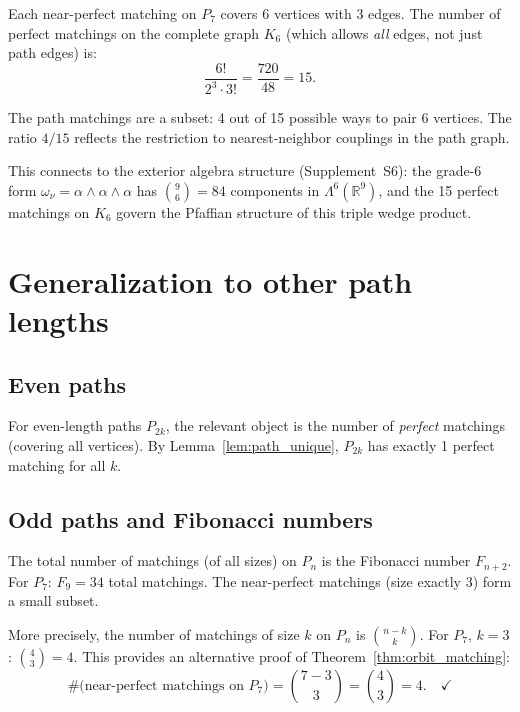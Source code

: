 \documentclass[11pt,letterpaper]{article}
\numberwithin{equation}{section}
\begin{document}
Each near-perfect matching on $P_7$ covers 6 vertices with 3 edges. The
number of perfect matchings on the complete graph $K_6$ (which allows
\emph{all} edges, not just path edges) is:
\begin{equation}
  \frac{6!}{2^3 \cdot 3!} = \frac{720}{48} = 15.
\end{equation}

The path matchings are a subset: 4 out of 15 possible ways to pair 6
vertices. The ratio $4/15$ reflects the restriction to nearest-neighbor
couplings in the path graph.

This connects to the exterior algebra structure (Supplement~S6): the
grade-6 form $\omega_\nu = \alpha \wedge \alpha \wedge \alpha$ has
$\binom{9}{6} = 84$ components in $\Lambda^6(\mathbb{R}^9)$, and the
15 perfect matchings on $K_6$ govern the Pfaffian structure of this triple
wedge product.

\section{Generalization to other path lengths}
\label{sec:generalization}

\subsection{Even paths}

For even-length paths $P_{2k}$, the relevant object is the number of
\emph{perfect} matchings (covering all vertices). By Lemma~\ref{lem:path_unique},
$P_{2k}$ has exactly 1 perfect matching for all $k$.

\subsection{Odd paths and Fibonacci numbers}

The total number of matchings (of all sizes) on $P_n$ is the Fibonacci
number $F_{n+2}$. For $P_7$: $F_9 = 34$ total matchings. The near-perfect
matchings (size exactly 3) form a small subset.

More precisely, the number of matchings of size $k$ on $P_n$ is
$\binom{n-k}{k}$. For $P_7$, $k = 3$: $\binom{4}{3} = 4$. This provides
an alternative proof of Theorem~\ref{thm:orbit_matching}:
\begin{equation}
  \#\text{(near-perfect matchings on }P_7\text{)} = \binom{7-3}{3} = \binom{4}{3} = 4. \quad \checkmark
\end{equation}
\end{document}
